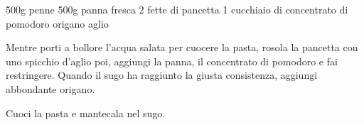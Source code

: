 \begin{ingreds}
	500g penne
	500g panna fresca
	2 fette di pancetta
	1 cucchiaio di concentrato di pomodoro
	origano
	aglio



\end{ingreds}

\begin{method}
Mentre porti a bollore l'acqua salata per cuocere la pasta, rosola la pancetta con uno spicchio d'aglio poi, aggiungi la panna, il concentrato di pomodoro e fai restringere. Quando il sugo ha raggiunto la giusta consistenza, aggiungi abbondante origano.

Cuoci la pasta e mantecala nel sugo.


\end{method}




